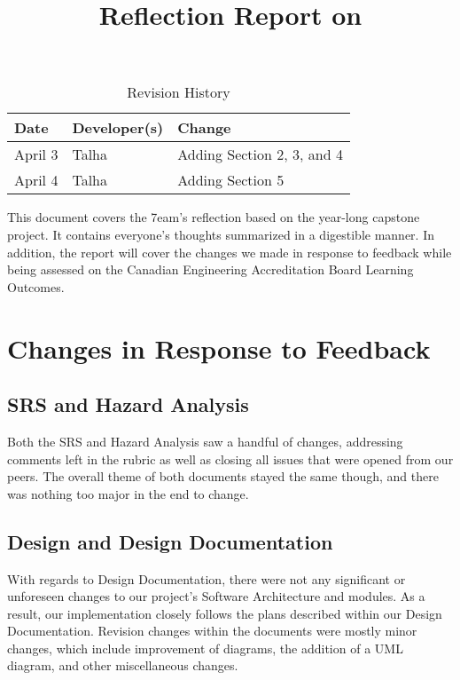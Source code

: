 \documentclass{article}
\title{Reflection Report on \progname}
\author{\authname}
\date{}
\begin{document}
\maketitle

\newpage

\tableofcontents

\newpage

\begin{table}[hp]
\caption{Revision History} \label{TblRevisionHistory}
\begin{tabularx}{\textwidth}{llX}
\toprule
\textbf{Date} & \textbf{Developer(s)} & \textbf{Change}\\
\midrule
April 3 & Talha & Adding Section 2, 3, and 4\\
April 4 & Talha & Adding Section 5\\
\bottomrule
\end{tabularx}
\end{table}

\newpage

\noindent This document covers the 7eam's reflection based on the year-long capstone project. It contains everyone's thoughts summarized in a digestible manner. In addition, the report will cover the changes we made in response to feedback while being assessed on the Canadian Engineering Accreditation Board Learning Outcomes.

\section{Changes in Response to Feedback}

\subsection{SRS and Hazard Analysis}
Both the SRS and Hazard Analysis saw a handful of changes, addressing comments left in the rubric as well as closing all issues that were opened from our peers. The overall theme of both documents stayed the same though, and there was nothing too major in the end to change.

\subsection{Design and Design Documentation}

With regards to Design Documentation, there were not any significant or unforeseen changes to our project's Software Architecture and modules. As a result, our implementation closely follows the plans described within our Design Documentation. Revision changes within the documents were mostly minor changes, which include improvement of diagrams, the addition of a UML diagram, and other miscellaneous changes.
\end{document}
